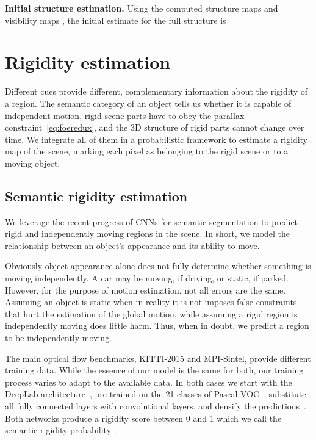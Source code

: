 \documentclass[10pt,twocolumn,letterpaper]{article}
\begin{document}
{\bf Initial structure estimation.}
\noindent
Using the computed structure maps  and visibility maps , the initial estimate for the full structure is 

 \section{Rigidity estimation}
\noindent
Different cues provide different, complementary information about the rigidity of a region.
The semantic category of an object tells us whether it is capable of independent motion, rigid scene parts have to obey the parallax constraint~\eqref{eq:foeredux}, and the 3D structure of rigid parts cannot change over time.
We integrate all of them in a probabilistic framework to estimate a rigidity map of the scene, marking each pixel as belonging to the rigid scene or to a moving object. 

\subsection{Semantic rigidity estimation}
\label{sec:rigidity_cnn}
\noindent









\noindent
We leverage the recent progress of CNNs for semantic segmentation to predict rigid and independently moving regions in the scene. In short, we model the relationship between an object's appearance and its ability to move. 

Obviously object appearance alone does not fully determine whether something is moving independently. 
A car may be moving, if driving, or static, if parked. 
However, for the purpose of motion estimation, not all errors are the same. 
Assuming an object is static when in reality it is not imposes false constraints that hurt the estimation of the global motion,
while assuming a rigid region is independently moving does little harm.
Thus, when in doubt, we predict a region to be independently moving.



The main optical flow benchmarks, KITTI-2015 and MPI-Sintel, provide different training data. While the essence of our model is the same for both, our training process varies to adapt to the available data. In both cases we start with the DeepLab architecture~\cite{ChenPKMY14}, pre-trained on the 21 classes of Pascal VOC~\cite{pascalVOC}, substitute all fully connected layers with convolutional layers,
and densify the predictions~\cite{Sevilla:SOF}. Both networks produce a rigidity score between 0 and 1 which we call the semantic rigidity probability .
\end{document}
